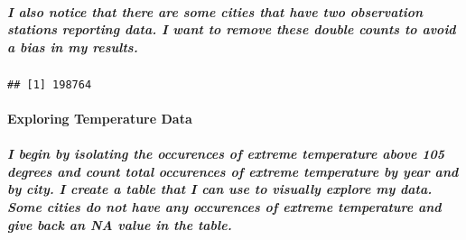 \documentclass[]{article}
\newenvironment{Shaded}{\begin{snugshade}}{\end{snugshade}}
\newcommand{\DataTypeTok}[1]{\textcolor[rgb]{0.13,0.29,0.53}{#1}}
\newcommand{\KeywordTok}[1]{\textcolor[rgb]{0.13,0.29,0.53}{\textbf{#1}}}
\newcommand{\NormalTok}[1]{#1}
\newcommand{\OperatorTok}[1]{\textcolor[rgb]{0.81,0.36,0.00}{\textbf{#1}}}
\newcommand{\OtherTok}[1]{\textcolor[rgb]{0.56,0.35,0.01}{#1}}
\newcommand{\StringTok}[1]{\textcolor[rgb]{0.31,0.60,0.02}{#1}}
\let\oldparagraph\paragraph
\renewcommand{\paragraph}[1]{\oldparagraph{#1}\mbox{}}
\let\oldsubparagraph\subparagraph
\renewcommand{\subparagraph}[1]{\oldsubparagraph{#1}\mbox{}}
\begin{document}
\hypertarget{i-also-notice-that-there-are-some-cities-that-have-two-observation-stations-reporting-data.-i-want-to-remove-these-double-counts-to-avoid-a-bias-in-my-results.}{%
\subparagraph{I also notice that there are some cities that have two
observation stations reporting data. I want to remove these double
counts to avoid a bias in my
results.}\label{i-also-notice-that-there-are-some-cities-that-have-two-observation-stations-reporting-data.-i-want-to-remove-these-double-counts-to-avoid-a-bias-in-my-results.}}

\begin{Shaded}
\end{Shaded}

\begin{verbatim}
## [1] 198764
\end{verbatim}

\hypertarget{exploring-temperature-data}{%
\paragraph{\texorpdfstring{\textbf{Exploring Temperature
Data}}{Exploring Temperature Data}}\label{exploring-temperature-data}}

\hypertarget{i-begin-by-isolating-the-occurences-of-extreme-temperature-above-105-degrees-and-count-total-occurences-of-extreme-temperature-by-year-and-by-city.-i-create-a-table-that-i-can-use-to-visually-explore-my-data.-some-cities-do-not-have-any-occurences-of-extreme-temperature-and-give-back-an-na-value-in-the-table.}{%
\subparagraph{I begin by isolating the occurences of extreme temperature
above 105 degrees and count total occurences of extreme temperature by
year and by city. I create a table that I can use to visually explore my
data. Some cities do not have any occurences of extreme temperature and
give back an NA value in the
table.}\label{i-begin-by-isolating-the-occurences-of-extreme-temperature-above-105-degrees-and-count-total-occurences-of-extreme-temperature-by-year-and-by-city.-i-create-a-table-that-i-can-use-to-visually-explore-my-data.-some-cities-do-not-have-any-occurences-of-extreme-temperature-and-give-back-an-na-value-in-the-table.}}
\end{document}
